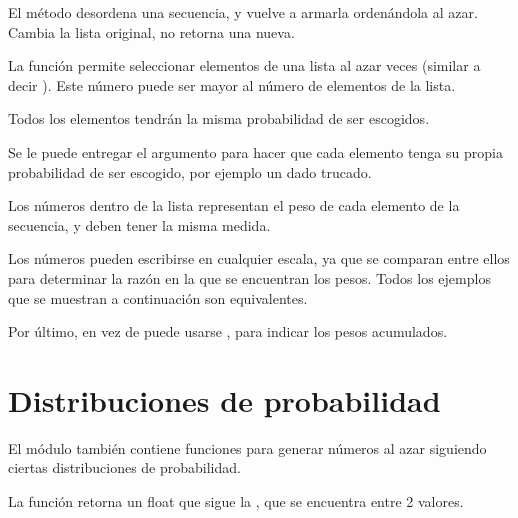 El método  desordena una secuencia, y vuelve a armarla ordenándola al azar. Cambia la lista original, no retorna una nueva.



La función  permite seleccionar elementos de una lista al azar  veces (similar a decir ). Este número puede ser mayor al número de elementos de la lista.


Todos los elementos tendrán la misma probabilidad de ser escogidos.\smallskip

Se le puede entregar el argumento  para hacer que cada elemento tenga su propia probabilidad de ser escogido, por ejemplo un dado trucado.


Los números dentro de la lista  representan el peso de cada elemento de la secuencia, y deben tener la misma medida.\smallskip

Los números pueden escribirse en cualquier escala, ya que se comparan entre ellos para determinar la razón en la que se encuentran los pesos. Todos los ejemplos que se muestran a continuación son equivalentes.


Por último, en vez de  puede usarse , para indicar los pesos acumulados.


\section{Distribuciones de probabilidad}

El módulo  también contiene funciones para generar números al azar siguiendo ciertas distribuciones de probabilidad.


La función  retorna un float que sigue la , que se encuentra entre 2 valores.

